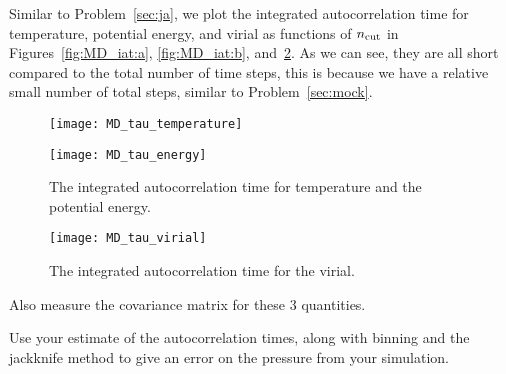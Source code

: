 Similar to Problem~\ref{sec:ja}, we plot the integrated autocorrelation time
for temperature, potential energy, and virial as functions of \(n_\textnormal{cut}\)
in Figures~\ref{fig:MD_iat:a},
\ref{fig:MD_iat:b}, and~\ref{fig:MD_iat:c}.
As we can see, they are all short compared to the total number of time steps,
this is because we have a relative small number of total steps, similar to
Problem~\ref{sec:mock}.

\begin{figure}
    \centering
    \begin{minipage}[t]{0.8\linewidth}
        \centering
        \texttt{[image: MD\_tau\_temperature]}
        \label{fig:MD_iat:a}
    \end{minipage}
    \hfill
    \begin{minipage}[t]{0.8\linewidth}
        \centering
        \texttt{[image: MD\_tau\_energy]}
        \label{fig:MD_iat:b}
    \end{minipage}
    \caption{The integrated autocorrelation time for temperature and the potential energy.}
    \label{fig:MD_iat}
\end{figure}

\begin{figure}[H]
    \centering
    \texttt{[image: MD\_tau\_virial]}
    \caption{The integrated autocorrelation time for the virial.}
    \label{fig:MD_iat:c}
\end{figure}


\Question{} Also measure the covariance matrix for these \(3\) quantities.

\Answer{}



\Question{} Use your estimate of the autocorrelation times, along with binning and the
jackknife method to give an error on the pressure from your simulation.

\Answer{}

